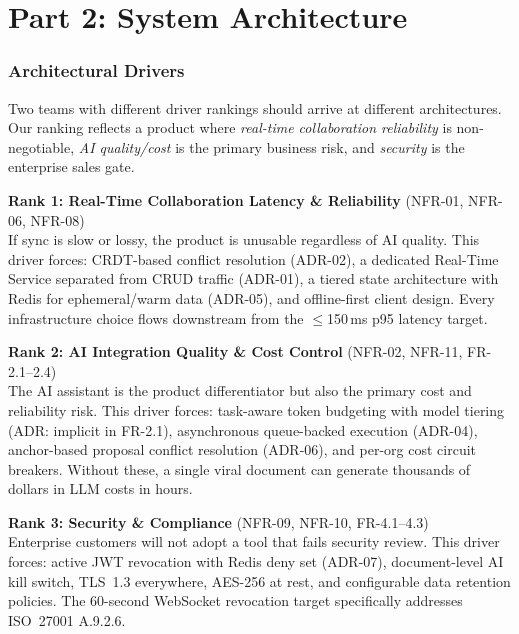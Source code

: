 \documentclass[10pt, a4paper]{article}
\begin{document}
\newpage
\part*{\color{accent}Part 2: System Architecture}

\section{Architectural Drivers}

\begin{decisionbox}
\small Two teams with different driver rankings should arrive at different architectures. Our ranking reflects a product where \emph{real-time collaboration reliability} is non-negotiable, \emph{AI quality/cost} is the primary business risk, and \emph{security} is the enterprise sales gate.
\end{decisionbox}

\noindent\textbf{Rank 1: Real-Time Collaboration Latency \& Reliability} {\small(NFR-01, NFR-06, NFR-08)}\\[2pt]
{\small If sync is slow or lossy, the product is unusable regardless of AI quality. This driver forces: CRDT-based conflict resolution (ADR-02), a dedicated Real-Time Service separated from CRUD traffic (ADR-01), a tiered state architecture with Redis for ephemeral/warm data (ADR-05), and offline-first client design. Every infrastructure choice flows downstream from the $\le$150\,ms p95 latency target.}

\vspace{6pt}
\noindent\textbf{Rank 2: AI Integration Quality \& Cost Control} {\small(NFR-02, NFR-11, FR-2.1--2.4)}\\[2pt]
{\small The AI assistant is the product differentiator but also the primary cost and reliability risk. This driver forces: task-aware token budgeting with model tiering (ADR: implicit in FR-2.1), asynchronous queue-backed execution (ADR-04), anchor-based proposal conflict resolution (ADR-06), and per-org cost circuit breakers. Without these, a single viral document can generate thousands of dollars in LLM costs in hours.}

\vspace{6pt}
\noindent\textbf{Rank 3: Security \& Compliance} {\small(NFR-09, NFR-10, FR-4.1--4.3)}\\[2pt]
{\small Enterprise customers will not adopt a tool that fails security review. This driver forces: active JWT revocation with Redis deny set (ADR-07), document-level AI kill switch, TLS~1.3 everywhere, AES-256 at rest, and configurable data retention policies. The 60-second WebSocket revocation target specifically addresses ISO~27001 A.9.2.6.}
\end{document}
